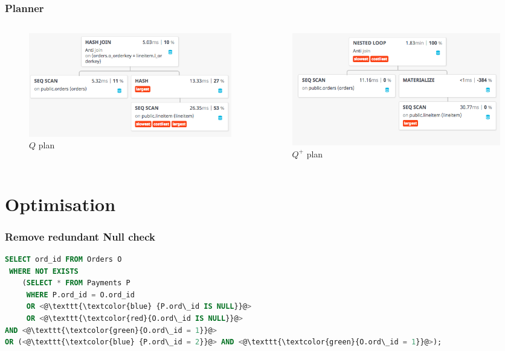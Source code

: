\documentclass{beamer}
\begin{document}
		\begin{frame}
			\frametitle{Planner}
			\begin{columns}
				\begin{column}{0.52\textwidth}
					\begin{figure}
						\includegraphics[scale=0.29]{qplan}
						\caption{$Q$ plan}
					\end{figure}
				\end{column}
				\begin{column}{0.52\textwidth}
					\begin{figure}
						\includegraphics[scale=0.29]{rqplan}
						\caption{$Q^+$ plan}
					\end{figure}
				\end{column}
			\end{columns}
		\end{frame}
		
		
		\section{Optimisation}
		
		\begin{frame}[containsverbatim]
			\frametitle{Remove redundant Null check}
				\begin{lstlisting}[language=SQL]
SELECT ord_id FROM Orders O
 WHERE NOT EXISTS  
	(SELECT * FROM Payments P 
	 WHERE P.ord_id = O.ord_id 
	 OR <@\texttt{\textcolor{blue} {P.ord\_id IS NULL}}@>
	 OR <@\texttt{\textcolor{red}{O.ord\_id IS NULL}}@>
AND <@\texttt{\textcolor{green}{O.ord\_id = 1}}@>
OR (<@\texttt{\textcolor{blue} {P.ord\_id = 2}}@> AND <@\texttt{\textcolor{green}{O.ord\_id = 1}}@>);
				\end{lstlisting}
		\end{frame}
		
\end{document}
